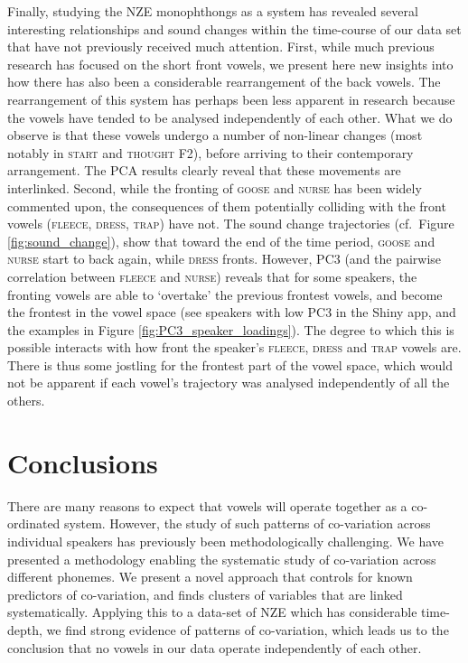 \documentclass[review]{elsarticle} %
\begin{document}
Finally, studying the NZE monophthongs as a system has revealed several interesting relationships and sound changes within the time-course of our data set that have not previously received much attention.  First, while much previous research has focused on the short front vowels, we present here new insights into how there has also been a considerable rearrangement of the back vowels.  The rearrangement of this system has perhaps been less apparent in research because the vowels have tended to be analysed independently of each other. What we do observe is that these vowels undergo a number of non-linear changes (most notably in \textsc{start} and \textsc{thought} F2), before arriving to their contemporary arrangement.
The PCA results clearly reveal that these movements are interlinked.  Second, while the fronting of \textsc{goose} and \textsc{nurse} has been widely commented upon, the consequences of them potentially colliding with the front vowels (\textsc{fleece, dress, trap}) have not.  The sound change trajectories (cf.\ Figure \ref{fig:sound_change}), show that toward the end of the time period, \textsc{goose} and \textsc{nurse} start to back again, while \textsc{dress} fronts.  However, PC3 (and the pairwise correlation between \textsc{fleece} and \textsc{nurse}) reveals that for some speakers, the fronting vowels are able to `overtake' the previous frontest vowels, and become the frontest in the vowel space (see speakers with low PC3 in the Shiny app, and the examples in Figure \ref{fig:PC3_speaker_loadings}). The degree to which this is possible interacts with how front the speaker's \textsc{fleece, dress} and \textsc{trap} vowels are.  There is thus some jostling for the frontest part of the vowel space, which would not be apparent if each vowel's trajectory was analysed independently of all the others. 

\section{Conclusions}

There are many reasons to expect that vowels will operate together as a co-ordinated system. However, the study of such patterns of co-variation across individual speakers has previously been methodologically challenging.  We have presented a methodology enabling the systematic study of co-variation across different phonemes.  We present a novel approach that controls for known predictors of co-variation, and finds clusters of variables that are linked systematically. Applying this to a data-set of NZE which has considerable time-depth, we find strong evidence of patterns of co-variation, which leads us to the conclusion that no vowels in our data operate independently of each other.  
\end{document}
